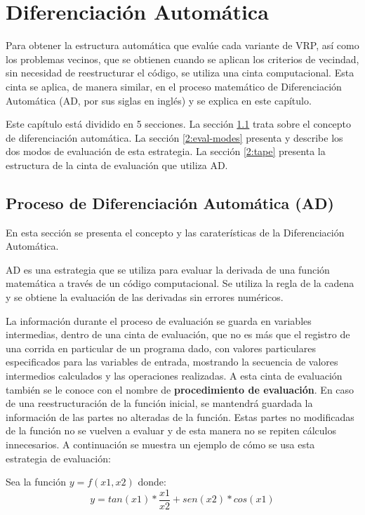 \chapter{Diferenciación Automática}\label{chapter: AD}

Para obtener la estructura automática que evalúe cada variante de VRP, así como los problemas vecinos, que se obtienen cuando se aplican los criterios de vecindad, sin necesidad de reestructurar el código, se utiliza una cinta computacional. Esta cinta se aplica, de manera similar, en el proceso matemático de Diferenciación Automática (AD, por sus siglas en inglés) y se explica en este capítulo.

Este capítulo está dividido en 5 secciones. La sección \ref{2:AD-process} trata sobre el concepto de diferenciación automática. La sección \ref{2:eval-modes} presenta y describe los dos modos de evaluación de esta estrategia. La sección \ref{2:tape} presenta la estructura de la cinta de evaluación que utiliza AD.
\section{Proceso de Diferenciación Automática (AD)}\label{2:AD-process}
En esta sección se presenta el concepto y las caraterísticas de la Diferenciación Automática.

AD es una estrategia que se utiliza para evaluar la derivada de una función matemática a través de un código computacional. Se utiliza la regla de la cadena y se obtiene la evaluación de las derivadas sin errores numéricos.

La información durante el proceso de evaluación se guarda en variables intermedias, dentro de una cinta de evaluación, que no es más que el registro de una corrida en particular de un programa dado, con valores particulares especificados para las variables de entrada, mostrando la secuencia de valores intermedios calculados y las operaciones realizadas. A esta cinta de evaluación también se le conoce con el nombre de \textbf{procedimiento de evaluación}. En caso de una reestructuración de la función inicial, se mantendrá guardada la información de las partes no alteradas de la función. Estas partes no modificadas de la función no se vuelven a evaluar y de esta manera no se repiten cálculos innecesarios. A continuación se muestra un ejemplo de cómo se usa esta estrategia de evaluación:

Sea la función $y = f(x1,x2)$ donde:
\begin{equation}
	\label{eq:example}
y = tan(x1) * \frac{x1}{x2} + sen(x2) * cos(x1)
\end{equation}

